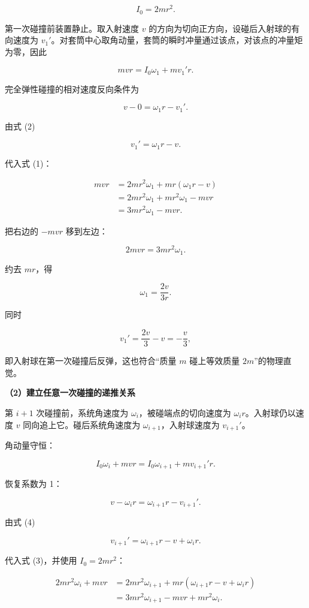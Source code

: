 \documentclass[12pt,a4paper,UTF8]{ctexart}
\begin{document}
\[
I_0=2mr^2.
\]

第一次碰撞前装置静止。取入射速度 \(v\)
的方向为切向正方向，设碰后入射球的有向速度为
\(v_1'\)。对套筒中心取角动量，套筒的瞬时冲量通过该点，对该点的冲量矩为零，因此

\[
mvr=I_0\omega_1+mv_1'r. \tag{1}
\]

完全弹性碰撞的相对速度反向条件为

\[
v-0=\omega_1r-v_1'. \tag{2}
\]

由式 (2)

\[v_1'=\omega_1r-v.\]

代入式 (1)：

\[
\begin{aligned}
mvr
&=2mr^2\omega_1+mr(\omega_1r-v)\\
&=2mr^2\omega_1+mr^2\omega_1-mvr\\
&=3mr^2\omega_1-mvr.
\end{aligned}
\]

把右边的 \(-mvr\) 移到左边：

\[2mvr=3mr^2\omega_1.\]

约去 \(mr\)，得

\[
\boxed{\omega_1=\frac{2v}{3r}}.
\]

同时

\[
v_1'=\frac{2v}{3}-v=-\frac v3,
\]

即入射球在第一次碰撞后反弹，这也符合``质量 \(m\) 碰上等效质量
\(2m\)''的物理直觉。

\textbf{（2）建立任意一次碰撞的递推关系}

第 \(i+1\) 次碰撞前，系统角速度为 \(\omega_i\)，被碰端点的切向速度为
\(\omega_i r\)。入射球仍以速度 \(v\) 同向追上它。碰后系统角速度为
\(\omega_{i+1}\)，入射球速度为 \(v_{i+1}'\)。

角动量守恒：

\[
I_0\omega_i+mvr=I_0\omega_{i+1}+mv_{i+1}'r. \tag{3}
\]

恢复系数为 1：

\[
v-\omega_i r=\omega_{i+1}r-v_{i+1}'. \tag{4}
\]

由式 (4)

\[
v_{i+1}'=\omega_{i+1}r-v+\omega_i r.
\]

代入式 (3)，并使用 \(I_0=2mr^2\)：

\[
\begin{aligned}
2mr^2\omega_i+mvr
&=2mr^2\omega_{i+1}
+mr(\omega_{i+1}r-v+\omega_i r)\\
&=3mr^2\omega_{i+1}-mvr+mr^2\omega_i.
\end{aligned}
\]
\end{document}
